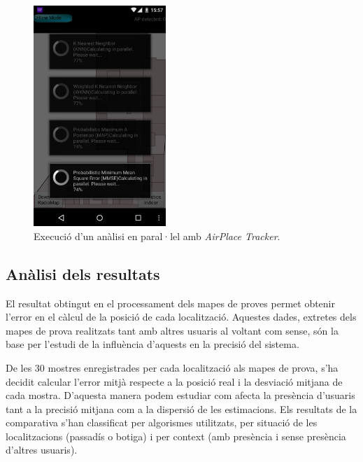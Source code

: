 \begin{figure}[ht]
\begin{center}
\includegraphics[width=5cm]{imatges/analisi_offline_paralel.png}
\caption{Execució d'un anàlisi en paral·lel amb \textit{AirPlace Tracker}.}
\label{fig:analisi_offline_paralel}
\end{center}
\end{figure}

\subsection{Anàlisi dels resultats}

El resultat obtingut en el processament dels mapes de proves permet obtenir l'error en el càlcul de la posició de cada localització. Aquestes dades, extretes dels mapes de prova realitzats  tant amb altres usuaris al voltant com sense, són la base per l'estudi de la influència d'aquests en la precisió del sistema.

De les 30 mostres enregistrades per cada localització als mapes de prova, s'ha decidit calcular l'error mitjà respecte a la posició real i la desviació mitjana de cada mostra. D'aquesta manera podem estudiar com afecta la presència d'usuaris tant a la precisió mitjana com a la dispersió de les estimacions. Els resultats de la comparativa s'han classificat per algorismes utilitzats, per situació de les localitzacions (passadís o botiga) i per context (amb presència i sense presència d'altres usuaris).


